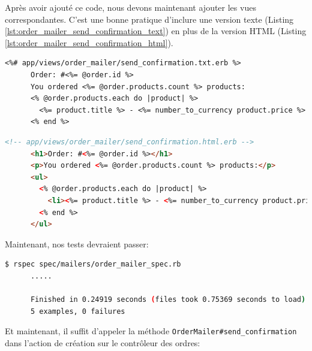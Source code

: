 \documentclass[]{report}
\begin{document}
    Après avoir ajouté ce code, nous devons maintenant ajouter les vues correspondantes. C'est une bonne pratique d'inclure une version texte (Listing \ref{lst:order_mailer_send_confirmation_text}) en plus de la version HTML (Listing \ref{lst:order_mailer_send_confirmation_html}).

    \begin{scriptsize}
      \begin{lstlisting}[caption={Vue de l'email de confirmation de commande au format texte}, label={lst:order_mailer_send_confirmation_text}]
      <%# app/views/order_mailer/send_confirmation.txt.erb %>
      Order: #<%= @order.id %>
      You ordered <%= @order.products.count %> products:
      <% @order.products.each do |product| %>
        <%= product.title %> - <%= number_to_currency product.price %>
      <% end %>
      \end{lstlisting}
    \end{scriptsize}

    \begin{scriptsize}
      \begin{lstlisting}[language=html, caption={Vue de l'email de confirmation de commande au format HTML}, label={lst:order_mailer_send_confirmation_html}]
      <!-- app/views/order_mailer/send_confirmation.html.erb -->
      <h1>Order: #<%= @order.id %></h1>
      <p>You ordered <%= @order.products.count %> products:</p>
      <ul>
        <% @order.products.each do |product| %>
          <li><%= product.title %> - <%= number_to_currency product.price %></li>
        <% end %>
      </ul>
      \end{lstlisting}
    \end{scriptsize}

    Maintenant, nos tests devraient passer:

    \begin{scriptsize}
      \begin{lstlisting}[language=bash]
      $ rspec spec/mailers/order_mailer_spec.rb
      .....

      Finished in 0.24919 seconds (files took 0.75369 seconds to load)
      5 examples, 0 failures
      \end{lstlisting}
    \end{scriptsize}

    Et maintenant, il suffit d'appeler la méthode \verb|OrderMailer#send_confirmation| dans l'action de création sur le contrôleur des ordres:
\end{document}

